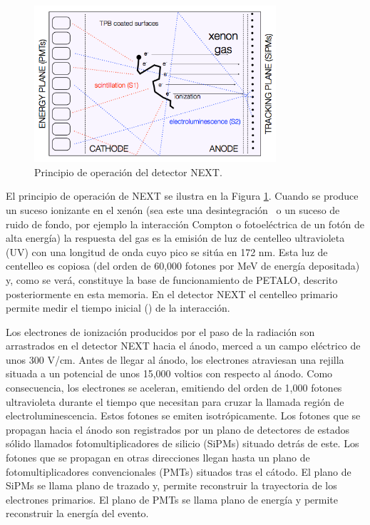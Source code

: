 \begin{figure}
\centering
\includegraphics[width=0.8\textwidth]{img/EL.png}
\caption{\small Principio de operación del detector NEXT. 
} \label{fig.EL}
\end{figure}
                                    
El principio de operación de NEXT se ilustra en la Figura \ref{fig.EL}. Cuando se produce un suceso ionizante en el xenón (sea este una desintegración \bb\ o un suceso de ruido de fondo, por ejemplo la interacción Compton o fotoeléctrica de un fotón de alta energía) la respuesta del gas es la emisión de luz de centelleo ultravioleta (UV) con una longitud de onda cuyo pico se sitúa en 172 nm. Esta luz de centelleo es copiosa (del orden de 60,000 fotones por MeV de energía depositada) y, como se verá, constituye la base de funcionamiento de PETALO, descrito posteriormente en esta memoria. En el detector NEXT el centelleo primario permite medir el tiempo inicial (\tto) de la interacción.

Los electrones de ionización producidos por el paso de la radiación son arrastrados en el detector NEXT hacia el ánodo, merced a un campo eléctrico de unos 300 V/cm. Antes de llegar al ánodo, los electrones atraviesan una rejilla situada a un potencial de unos 15,000 voltios con respecto al ánodo. Como consecuencia, los electrones se aceleran, emitiendo del orden de 1,000 fotones ultravioleta durante el tiempo que necesitan para cruzar la llamada región de electroluminescencia. Estos fotones se emiten isotrópicamente. Los fotones que se propagan hacia el ánodo son registrados por un plano de detectores de estados sólido llamados fotomultiplicadores de silicio (SiPMs) situado detrás de este. Los fotones que se propagan en otras direcciones llegan hasta un plano de fotomultiplicadores convencionales (PMTs) situados tras el cátodo. El plano de SiPMs se llama plano de trazado y, permite reconstruir la trayectoria de los electrones primarios. El plano de PMTs se llama plano de energía y permite reconstruir la energía del evento. 

